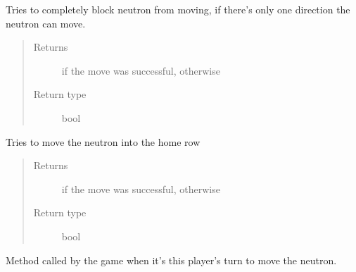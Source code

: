 \documentclass[letterpaper,10pt,english,openany,oneside]{sphinxmanual}
\begin{document}
\begin{fulllineitems}
\begin{fulllineitems}
\label{\detokenize{player:player.StrategyPlayer.block_neutron}}
Tries to completely block neutron from moving, if there’s only one
direction the neutron can move.
\begin{quote}\begin{description}
\item[{Returns}] \leavevmode
{} if the move was successful,  otherwise

\item[{Return type}] \leavevmode
bool

\end{description}\end{quote}

\end{fulllineitems}


\begin{fulllineitems}
\label{\detokenize{player:player.StrategyPlayer.move_into_home}}
Tries to move the neutron into the home row
\begin{quote}\begin{description}
\item[{Returns}] \leavevmode
{} if the move was successful,  otherwise

\item[{Return type}] \leavevmode
bool

\end{description}\end{quote}

\end{fulllineitems}


\begin{fulllineitems}
\label{\detokenize{player:player.StrategyPlayer.move_neutron}}
Method called by the game when it’s this player’s turn to move the
neutron.


\end{fulllineitems}
\end{fulllineitems}
\end{document}
